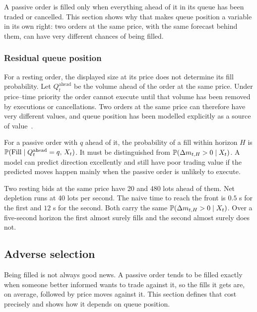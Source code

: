 A passive order is filled only when everything ahead of it in its queue has been traded or
cancelled. This section shows why that makes queue position a variable in its own right: two orders
at the same price, with the same forecast behind them, can have very different chances of being
filled.

\subsubsection{Residual queue position}

For a resting order, the displayed size at its price does not determine its fill probability. Let
$Q^{\text{ahead}}_t$ be the volume ahead of the order at the same price. Under price--time
priority the order cannot execute until that volume has been removed by executions or
cancellations. Two orders at the same price can therefore have very different values, and queue
position has been modelled explicitly as a source of value~\citep{moallemi2017}.

For a passive order with $q$ ahead of it, the probability of a fill within horizon $H$ is
$\P(\Fill \mid Q^{\text{ahead}}_t = q,\, X_t)$. It must be distinguished from
$\P(\Delta m_{t,H} > 0 \mid X_t)$. A model can predict direction excellently and still have poor
trading value if the predicted moves happen mainly when the passive order is unlikely to execute.

\begin{example}
\label{ex:queue}
Two resting bids at the same price have 20 and 480 lots ahead of them. Net depletion runs at 40
lots per second. The naive time to reach the front is $0.5$ s for the first and $12$ s for the
second. Both carry the same $\P(\Delta m_{t,H} > 0 \mid X_t)$. Over a five-second horizon the first
almost surely fills and the second almost surely does not.
\end{example}

\subsection{Adverse selection}
\label{sec:adverse}

Being filled is not always good news. A passive order tends to be filled exactly when someone better
informed wants to trade against it, so the fills it gets are, on average, followed by price moves
against it. This section defines that cost precisely and shows how it depends on queue position.

